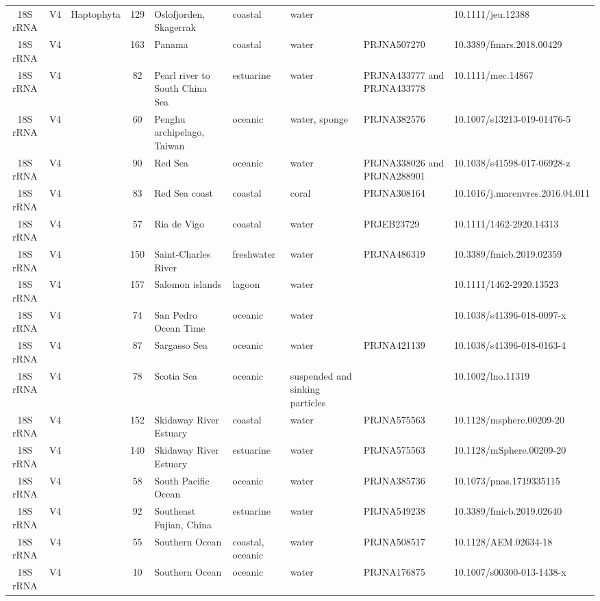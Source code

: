 \begin{longtable}{cccclllll}
  18S rRNA & V4 & Haptophyta & 129 & Oslofjorden, Skagerrak & coastal & water &  & 10.1111/jeu.12388 \\ 
  18S rRNA & V4 &  & 163 & Panama & coastal & water & PRJNA507270 & 10.3389/fmars.2018.00429 \\ 
  18S rRNA & V4 &  & 82 & Pearl river to South China Sea & estuarine & water & PRJNA433777 and PRJNA433778 & 10.1111/mec.14867 \\ 
  18S rRNA & V4 &  & 60 & Penghu archipelago, Taiwan & oceanic & water, sponge & PRJNA382576 & 10.1007/s13213-019-01476-5 \\ 
  18S rRNA & V4 &  & 90 & Red Sea & oceanic & water & PRJNA338026 and PRJNA288901  & 10.1038/s41598-017-06928-z \\ 
  18S rRNA & V4 &  & 83 & Red Sea coast & coastal & coral & PRJNA308164 & 10.1016/j.marenvres.2016.04.011 \\ 
  18S rRNA & V4 &  & 57 & Ria de Vigo & coastal & water & PRJEB23729 & 10.1111/1462-2920.14313 \\ 
  18S rRNA & V4 &  & 150 & Saint-Charles River & freshwater & water & PRJNA486319 & 10.3389/fmicb.2019.02359 \\ 
  18S rRNA & V4 &  & 157 & Salomon islands & lagoon & water &  & 10.1111/1462-2920.13523 \\ 
  18S rRNA & V4 &  & 74 & San Pedro Ocean Time & oceanic & water &  & 10.1038/s41396-018-0097-x \\ 
  18S rRNA & V4 &  & 87 & Sargasso Sea & oceanic & water & PRJNA421139  & 10.1038/s41396-018-0163-4 \\ 
  18S rRNA & V4 &  & 78 & Scotia Sea & oceanic & suspended and sinking particles &  & 10.1002/lno.11319 \\ 
  18S rRNA & V4 &  & 152 & Skidaway River Estuary & coastal & water & PRJNA575563  & 10.1128/msphere.00209-20 \\ 
  18S rRNA & V4 &  & 140 & Skidaway River Estuary & estuarine & water & PRJNA575563  & 10.1128/mSphere.00209-20 \\ 
  18S rRNA & V4 &  & 58 & South Pacific Ocean & oceanic & water & PRJNA385736 & 10.1073/pnas.1719335115 \\ 
  18S rRNA & V4 &  & 92 & Southeast Fujian, China & estuarine & water & PRJNA549238 & 10.3389/fmicb.2019.02640 \\ 
  18S rRNA & V4 &  & 55 & Southern Ocean & coastal, oceanic & water & PRJNA508517 & 10.1128/AEM.02634-18 \\ 
  18S rRNA & V4 &  & 10 & Southern Ocean & oceanic & water & PRJNA176875 & 10.1007/s00300-013-1438-x \\ 

\end{longtable}
